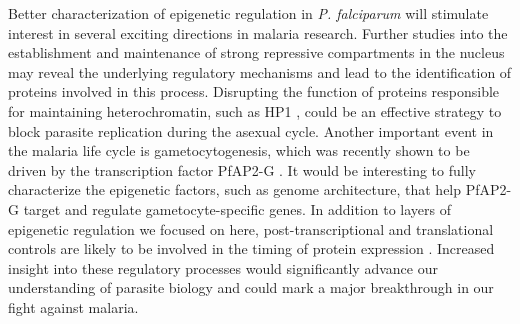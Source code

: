 Better characterization of epigenetic regulation in \textit{P. falciparum} will
stimulate interest in several exciting directions in malaria research. Further
studies into the establishment and maintenance of strong repressive
compartments in the nucleus may reveal the underlying regulatory mechanisms
and lead to the identification of proteins involved in this process.
Disrupting the function of proteins responsible for maintaining
heterochromatin, such as HP1 \citep{brancucci:heterochromatin},
could be an effective strategy to block
parasite replication during the asexual cycle. Another important event in the
malaria life cycle is gametocytogenesis, which was recently shown to be driven
by the transcription factor PfAP2-G \citep{kafsack:transcriptional,
sinha:cascade}. It would be interesting to fully
characterize the epigenetic factors, such as genome architecture, that help
PfAP2-G target and regulate gametocyte-specific genes. In addition to layers
of epigenetic regulation we focused on here, post-transcriptional and
translational controls are likely to be involved in the timing of protein
expression \citep{suvorova:transcript, kramer:rna, bunnik:polysome, leroch:global}.
Increased insight into these regulatory processes
would significantly advance our understanding of parasite biology and could
mark a major breakthrough in our fight against malaria.
